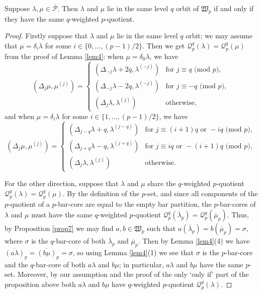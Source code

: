 \documentclass[ALCO, Unicode,published]{cedram}
\newcommand*\nicefrac[2]{#1/#2}
\begin{document}
\begin{prop}\label{prop8} 
Suppose $\lambda,\mu\in\overline{\mathcal{P}}$. Then $\lambda$ and $\mu$ lie in the same level $q$ orbit of $\mathfrak{W}_p$ if and only if they have the same $q$-weighted $p$-quotient. 
\end{prop}
\begin{proof}
Firstly suppose that $\lambda$ and $\mu$ lie in the same level $q$ orbit; we may assume that $\mu=\delta_i\lambda$ for some $i\in\{0,\dots,\nicefrac{(p-1)}{2}\}$. Then we get $\mathcal{Q}^q_p(\lambda)=\mathcal{Q}^q_p(\mu)$ from the proof of Lemma \ref{lem4}: when $\mu=\delta_0\lambda$, we have 
$$(\Delta_j\mu,\mu^{(j)})=\begin{cases}(\Delta_{-j}\lambda+2q,\lambda^{(-j)})&\text{for }j\equiv q\text{ (mod }p),\\
(\Delta_{-j}\lambda-2q,\lambda^{(-j)})&\text{for }j\equiv-q\text{ (mod }p),\\
(\Delta_j\lambda,\lambda^{(j)})&\text{otherwise},\end{cases}$$ 
and when $\mu=\delta_i\lambda$ for some $i\in\{1,\dots,\nicefrac{(p-1)}{2}\}$, we have 
$$(\Delta_j\mu,\mu^{(j)})=\begin{cases}(\Delta_{j-q}\lambda+q,\lambda^{(j-q)})&\text{for }j\equiv(i+1)q\text{ or }-iq\text{ (mod }p),\\
(\Delta_{j+q}\lambda-q,\lambda^{(j+q)})&\text{for }j\equiv iq\text{ or }-(i+1)q\text{ (mod }p),\\
(\Delta_j\lambda,\lambda^{(j)})&\text{otherwise}.\end{cases}$$ 

For the other direction, suppose that $\lambda$ and $\mu$ share the $q$-weighted $p$-quotient $\mathcal{Q}^q_p(\lambda)=\mathcal{Q}^q_p(\mu)$. By the definition of the $p$-set, and since all components of the $p$-quotient of a $p$-bar-core are equal to the empty bar partition, the $p$-bar-cores of $\lambda$ and $\mu$ must have the same $q$-weighted $p$-quotient $\mathcal{Q}^q_p(\overline{\lambda}_p)=\mathcal{Q}^q_p(\overline{\mu}_p)$. Thus, by Proposition \ref{prop7} we may find $a,b\in\mathfrak{W}_p$ such that $a(\overline{\lambda}_p)=b(\overline{\mu}_p)=\sigma$, where $\sigma$ is the $q$-bar-core of both $\overline{\lambda}_p$ and $\overline{\mu}_p$. Then by Lemma \ref{lem4}(4) we have $\overline{(a\lambda)}_p=\overline{(b\mu)}_p=\sigma$, so using Lemma \ref{lem4}(1) we see that $\sigma$ is the $p$-bar-core and the $q$-bar-core of both $a\lambda$ and $b\mu$; in particular, $a\lambda$ and $b\mu$ have the same $p$-set. Moreover, by our assumption and the proof of the only `only if' part of the proposition above both $a\lambda$ and $b\mu$ have $q$-weighted $p$-quotient $\mathcal{Q}^q_p(\lambda)$. 


\end{proof}
\end{document}
